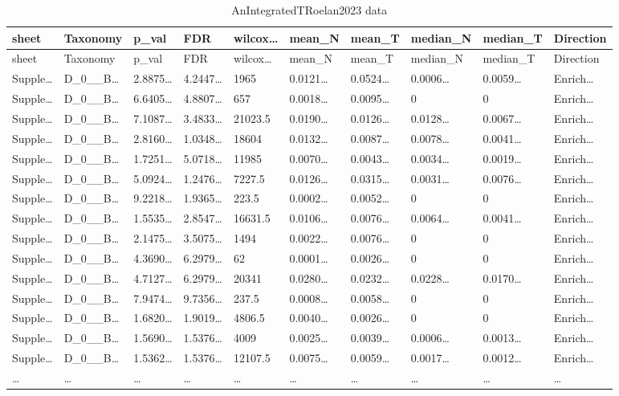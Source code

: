 \documentclass[
]{article}
\begin{document}
\begin{longtable}[]{@{}llllllllll@{}}
\caption{\label{tab:AnIntegratedTRoelan2023-data}AnIntegratedTRoelan2023 data}\tabularnewline
\toprule
sheet & Taxonomy & p\_val & FDR & wilcox\ldots{} & mean\_N & mean\_T & median\_N & median\_T & Direction\tabularnewline
\midrule
\endfirsthead
\toprule
sheet & Taxonomy & p\_val & FDR & wilcox\ldots{} & mean\_N & mean\_T & median\_N & median\_T & Direction\tabularnewline
\midrule
\endhead
Supple\ldots{} & D\_0\_\_B\ldots{} & 2.8875\ldots{} & 4.2447\ldots{} & 1965 & 0.0121\ldots{} & 0.0524\ldots{} & 0.0006\ldots{} & 0.0059\ldots{} & Enrich\ldots{}\tabularnewline
Supple\ldots{} & D\_0\_\_B\ldots{} & 6.6405\ldots{} & 4.8807\ldots{} & 657 & 0.0018\ldots{} & 0.0095\ldots{} & 0 & 0 & Enrich\ldots{}\tabularnewline
Supple\ldots{} & D\_0\_\_B\ldots{} & 7.1087\ldots{} & 3.4833\ldots{} & 21023.5 & 0.0190\ldots{} & 0.0126\ldots{} & 0.0128\ldots{} & 0.0067\ldots{} & Enrich\ldots{}\tabularnewline
Supple\ldots{} & D\_0\_\_B\ldots{} & 2.8160\ldots{} & 1.0348\ldots{} & 18604 & 0.0132\ldots{} & 0.0087\ldots{} & 0.0078\ldots{} & 0.0041\ldots{} & Enrich\ldots{}\tabularnewline
Supple\ldots{} & D\_0\_\_B\ldots{} & 1.7251\ldots{} & 5.0718\ldots{} & 11985 & 0.0070\ldots{} & 0.0043\ldots{} & 0.0034\ldots{} & 0.0019\ldots{} & Enrich\ldots{}\tabularnewline
Supple\ldots{} & D\_0\_\_B\ldots{} & 5.0924\ldots{} & 1.2476\ldots{} & 7227.5 & 0.0126\ldots{} & 0.0315\ldots{} & 0.0031\ldots{} & 0.0076\ldots{} & Enrich\ldots{}\tabularnewline
Supple\ldots{} & D\_0\_\_B\ldots{} & 9.2218\ldots{} & 1.9365\ldots{} & 223.5 & 0.0002\ldots{} & 0.0052\ldots{} & 0 & 0 & Enrich\ldots{}\tabularnewline
Supple\ldots{} & D\_0\_\_B\ldots{} & 1.5535\ldots{} & 2.8547\ldots{} & 16631.5 & 0.0106\ldots{} & 0.0076\ldots{} & 0.0064\ldots{} & 0.0041\ldots{} & Enrich\ldots{}\tabularnewline
Supple\ldots{} & D\_0\_\_B\ldots{} & 2.1475\ldots{} & 3.5075\ldots{} & 1494 & 0.0022\ldots{} & 0.0076\ldots{} & 0 & 0 & Enrich\ldots{}\tabularnewline
Supple\ldots{} & D\_0\_\_B\ldots{} & 4.3690\ldots{} & 6.2979\ldots{} & 62 & 0.0001\ldots{} & 0.0026\ldots{} & 0 & 0 & Enrich\ldots{}\tabularnewline
Supple\ldots{} & D\_0\_\_B\ldots{} & 4.7127\ldots{} & 6.2979\ldots{} & 20341 & 0.0280\ldots{} & 0.0232\ldots{} & 0.0228\ldots{} & 0.0170\ldots{} & Enrich\ldots{}\tabularnewline
Supple\ldots{} & D\_0\_\_B\ldots{} & 7.9474\ldots{} & 9.7356\ldots{} & 237.5 & 0.0008\ldots{} & 0.0058\ldots{} & 0 & 0 & Enrich\ldots{}\tabularnewline
Supple\ldots{} & D\_0\_\_B\ldots{} & 1.6820\ldots{} & 1.9019\ldots{} & 4806.5 & 0.0040\ldots{} & 0.0026\ldots{} & 0 & 0 & Enrich\ldots{}\tabularnewline
Supple\ldots{} & D\_0\_\_B\ldots{} & 1.5690\ldots{} & 1.5376\ldots{} & 4009 & 0.0025\ldots{} & 0.0039\ldots{} & 0.0006\ldots{} & 0.0013\ldots{} & Enrich\ldots{}\tabularnewline
Supple\ldots{} & D\_0\_\_B\ldots{} & 1.5362\ldots{} & 1.5376\ldots{} & 12107.5 & 0.0075\ldots{} & 0.0059\ldots{} & 0.0017\ldots{} & 0.0012\ldots{} & Enrich\ldots{}\tabularnewline
\ldots{} & \ldots{} & \ldots{} & \ldots{} & \ldots{} & \ldots{} & \ldots{} & \ldots{} & \ldots{} & \ldots{}\tabularnewline
\bottomrule
\end{longtable}
\end{document}
